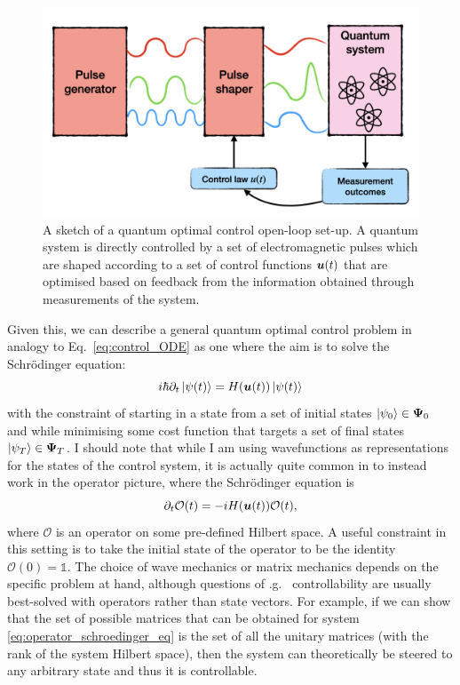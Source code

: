 \begin{figure}[t]
\centering
\includegraphics[width=0.8\linewidth]{images/optimal_control_placeholder.png} \caption[Schematic diagram of open-loop quantum optimal control]{A sketch of a quantum optimal control open-loop set-up. A quantum system is directly controlled by a set of electromagnetic pulses which are shaped according to a set of control functions $\boldsymbol{u}(t)$ that are optimised based on feedback from the information obtained through measurements of the system.}\label{fig:quantum_optimal_control}
\end{figure}

Given this, we can describe a general quantum optimal control problem in analogy to Eq.~\eqref{eq:control_ODE} as one where the aim is to solve the Schr\"{o}dinger equation:
\begin{equation}\label{eq:optimal_control_schroedinger}
    i \hbar \partial_t \ket{\psi(t)} = H(\boldsymbol{u}(t))\ket{\psi(t)}
\end{equation}
with the constraint of starting in a state from a set of initial states $\ket{\psi_0} \in \boldsymbol \Psi_0$ and while minimising some cost function that targets a set of final states $\ket{\psi_T} \in \boldsymbol \Psi_T$. I should note that while I am using wavefunctions as representations for the states of the control system, it is actually quite common in  to instead work in the operator picture, where the Schr\"{o}dinger equation is
\begin{equation}\label{eq:operator_schroedinger_eq}
    \partial_t \mathcal{O}(t) = -i H(\boldsymbol{u}(t))\mathcal{O}(t),
\end{equation}
where $\mathcal{O}$ is an operator on some pre-defined Hilbert space. A useful constraint in this setting is to take the initial state of the operator to be the identity $\mathcal{O}(0) = \mathds{1}$. The choice of wave mechanics or matrix mechanics depends on the specific  problem at hand, although questions of \@e.g.~ controllability are usually best-solved with operators rather than state vectors. For example, if we can show that the set of possible matrices that can be obtained for system \eqref{eq:operator_schroedinger_eq} is the set of all the unitary matrices (with the rank of the system Hilbert space), then the system can theoretically be steered to any arbitrary state and thus it is controllable.

